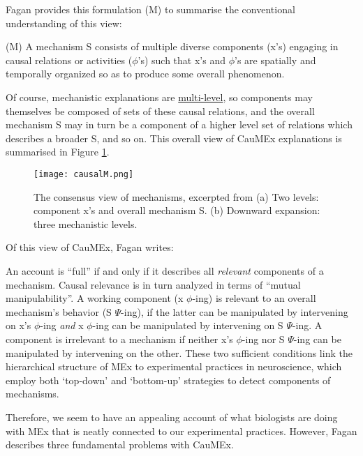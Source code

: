 Fagan provides this formulation (M) to summarise the conventional understanding of this view:

\begin{longquote}
(M) A mechanism S consists of multiple diverse components (x's) engaging in causal relations or activities ($\phi$'s) such that x's and $\phi$'s are 
spatially and temporally organized so as to produce some overall
phenomenon.
\cite[p.95]{Fagan2013}
\end{longquote}

Of course, mechanistic explanations are \hyperref[hierarchy]{multi-level}, so components may themselves be composed of sets of these causal relations, and the overall mechanism S may in turn be a component of a higher level set of relations which describes a broader S, and so on. This overall view of CauMEx explanations is summarised in Figure \ref{fig:CausalM}.

\begin{figure}
\texttt{[image: causalM.png]}
\centering
\caption{The consensus view of mechanisms, excerpted from \cite[p.96]{Fagan2013} (a) Two levels: component x’s and overall mechanism S.
(b) Downward expansion: three mechanistic levels.}
\label{fig:CausalM}
\end{figure}

Of this view of CauMEx, Fagan writes:

\begin{longquote}
An account is “full” if and only if it describes all \textit{relevant} components of a mechanism. Causal relevance is in turn analyzed in terms of “mutual manipulability”. A working component (x $\phi$-ing) is relevant to an overall
mechanism’s behavior (S $\Psi$-ing), if the latter can be manipulated by
intervening on x's $\phi$-ing \textit{and} x $\phi$-ing can be manipulated by intervening on S $\Psi$-ing. A component is irrelevant to a mechanism if neither
x's $\phi$-ing nor S $\Psi$-ing can be manipulated by intervening on the other.
These two sufficient conditions link the hierarchical structure of MEx to
experimental practices in neuroscience, which employ both ‘top-down’
and ‘bottom-up’ strategies to detect components of mechanisms. \cite[p.100]{Fagan2013}
\end{longquote}

Therefore, we seem to have an appealing account of what biologists are doing with MEx that is neatly connected to our experimental practices. However, Fagan describes three fundamental problems with CauMEx.

